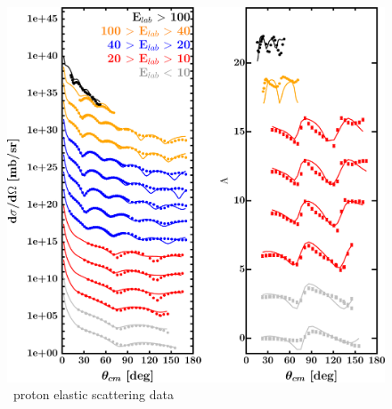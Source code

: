 \label{ca48DOMOutput}
\begin{figure}[H]
    \centering
    \begin{minipage}{0.45\textwidth}
        \centering
        \includegraphics[width=1.0\textwidth]{figures/ca48_protonElastic.png}
        \caption{\caEight\ proton elastic scattering data}
        \label{DOMFitData_ca48_proton_elastic}
    \end{minipage}\hfill
    \begin{minipage}{0.45\textwidth}
        \centering

\end{minipage}
\end{figure}
